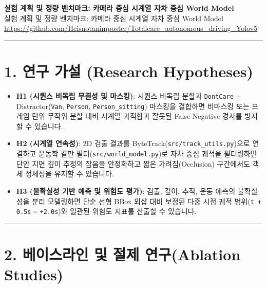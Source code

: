 \documentclass[10.5pt,a4paper]{article}
\begin{document}
\begin{center}
{\LARGE\bfseries 실험 계획 및 정량 벤치마크: 카메라 중심 시계열 자차 중심 World Model}\\[6pt]
{\normalsize\color{gray} 실험 계획 및 정량 벤치마크: 카메라 중심 시계열 자차 중심 World Model}\\[4pt]
{\small\href{https://github.com/Heisnotanimposter/Totalcare_autonomous_driving_Yolov5}{https://github.com/Heisnotanimposter/Totalcare\_autonomous\_driving\_Yolov5}}
\end{center}
\vspace{4pt}
\hrule
\vspace{8pt}

\section{1. 연구 가설 (Research Hypotheses)}

\begin{itemize}[leftmargin=1.5em,itemsep=2pt]
\item \textbf{H1 (시퀀스 비독립 무결성 및 마스킹)}: 시퀀스 비독립 분할과 \texttt{DontCare} + Distractor(\texttt{Van}, \texttt{Person}, \texttt{Person\_\allowbreak{}sitting}) 마스킹을 결합하면 비마스킹 또는 프레임 단위 무작위 분할 대비 시계열 과적합과 잘못된 False-Negative 경사를 방지할 수 있습니다.
\item \textbf{H2 (시계열 연속성)}: 2D 검출 결과를 ByteTrack(\texttt{src/\allowbreak{}track\_\allowbreak{}utils.\allowbreak{}py})으로 연결하고 운동학 칼만 필터(\texttt{src/\allowbreak{}world\_\allowbreak{}model.\allowbreak{}py})로 자차 중심 궤적을 필터링하면 단안 지면 깊이 추정의 잡음을 안정화하고 짧은 가려짐(Occlusion) 구간에서도 객체 정체성을 유지할 수 있습니다.
\item \textbf{H3 (불확실성 기반 예측 및 위험도 평가)}: 검출, 깊이, 추적, 운동 예측의 불확실성을 분리 모델링하면 단순 선형 BBox 외삽 대비 보정된 다중 시점 궤적 범위(\texttt{t + 0.\allowbreak{}5s} \textasciitilde{} \texttt{+2.\allowbreak{}0s})와 일관된 위험도 지표를 산출할 수 있습니다.
\end{itemize}

\par\noindent\rule{\textwidth}{0.4pt}\par\medskip

\section{2. 베이스라인 및 절제 연구(Ablation Studies)}
\end{document}
